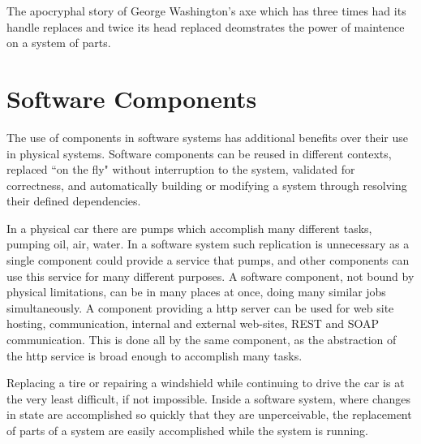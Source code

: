 \documentclass{report}
\begin{document}


The apocryphal story of George Washington's axe which has three times had its handle replaces and twice its head replaced deomstrates the power of maintence on a system of parts.


\section{Software Components}
{}The use of components in software systems has additional benefits over their use in physical systems.
{}Software components can be reused in different contexts, replaced ``on the fly" without interruption to the system, validated for correctness, 
{}and automatically building or modifying a system through resolving their defined dependencies.

In a physical car there are pumps which accomplish many different tasks, pumping oil, air, water.
In a software system such replication is unnecessary as a single component could provide a service that pumps, 
and other components can use this service for many different purposes.
A software component, not bound by physical limitations, can be in many places at once, doing many similar jobs simultaneously.
A component providing a http server can be used for web site hosting, communication, internal and external web-sites, REST and SOAP communication.
This is done all by the same component, as the abstraction of the http service is broad enough to accomplish many tasks.

Replacing a tire or repairing a windshield while continuing to drive the car is at the very least difficult, if not impossible.
Inside a software system, where changes in state are accomplished so quickly that they are unperceivable, the replacement of parts of a system are easily accomplished while the system is running.
\end{document}
